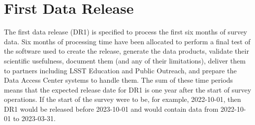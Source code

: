 \section{First Data Release } \label{sect:dr1}

The first data release (DR1) is specified to process the first six months of survey data.
Six months of processing time have been allocated to perform a final test of the software used to create the release, generate the data products, validate their scientific usefulness, document them (and any of their limitations), deliver them to partners including LSST Education and Public Outreach, and prepare the Data Access Center systems to handle them.
The sum of these time periods means that the expected release date for DR1 is one year after the start of survey operations.
If the start of the survey were to be, for example, 2022-10-01, then DR1 would be released before 2023-10-01 and would contain data from 2022-10-01 to 2023-03-31.
